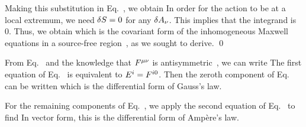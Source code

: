 \documentclass[11pt]{article}
\begin{document}
{	Making this substitution in Eq.~, we obtain
	In order for the action to be at a local extremum, we need $\delta S = 0$ for any $\delta A_\nu$.  This implies that the integrand is 0.  Thus, we obtain
	which is the covariant form of the inhomogeneous Maxwell equations in a source-free region~\cite[p.~557]{Jackson}, as we sought to derive. \qed
	
	From Eq.~ and the knowledge that $F^{\mu \nu}$ is antisymmetric~\cite[p.~556]{Jackson}, we can write
	The first equation of Eq.~ is equivalent to $E^i = F^{i 0}$.  Then the zeroth component of Eq.~ can be written
	which is the differential form of Gauss's law.
	
	For the remaining components of Eq.~, we apply the second equation of Eq.~ to find
	In vector form, this is
	the differential form of Amp\`{e}re's law.
}









\end{document}
